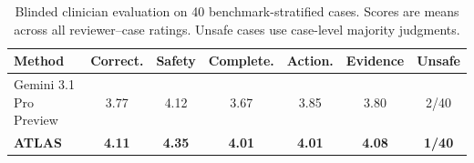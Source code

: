 \begin{table}[t]
\centering
\caption{Blinded clinician evaluation on 40 benchmark-stratified cases. Scores are means across all reviewer--case ratings. Unsafe cases use case-level majority judgments.}
\label{tab:expert_review}
\small
\setlength{\tabcolsep}{3.2pt}
\begin{tabular}{lcccccc}
\toprule
Method & Correct. & Safety & Complete. & Action. & Evidence & Unsafe \\
\midrule
Gemini 3.1 Pro Preview & 3.77 & 4.12 & 3.67 & 3.85 & 3.80 & 2/40 \\
\textbf{ATLAS} & \textbf{4.11} & \textbf{4.35} & \textbf{4.01} & \textbf{4.01} & \textbf{4.08} & \textbf{1/40} \\
\bottomrule
\end{tabular}
\end{table}
